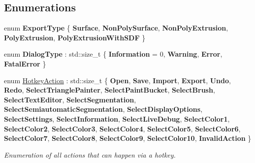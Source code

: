 \subsection*{Enumerations}
\begin{DoxyCompactItemize}
\item 
\mbox{\label{namespacepepr3d_a18ee6a20105f475c0c1e8622f98fc161}} 
enum {\bfseries Export\+Type} \{ \newline
{\bfseries Surface}, 
{\bfseries Non\+Poly\+Surface}, 
{\bfseries Non\+Poly\+Extrusion}, 
{\bfseries Poly\+Extrusion}, 
\newline
{\bfseries Poly\+Extrusion\+With\+S\+DF}
 \}
\item 
\mbox{\label{namespacepepr3d_ab78be750c70b46ae3d2dd03e440d4acc}} 
enum {\bfseries Dialog\+Type} \+: std\+::size\+\_\+t \{ {\bfseries Information} = 0, 
{\bfseries Warning}, 
{\bfseries Error}, 
{\bfseries Fatal\+Error}
 \}
\item 
\mbox{\label{namespacepepr3d_ae35d8dfd4e5925d633f100eb9b525cbe}} 
enum \mbox{\hyperlink{namespacepepr3d_ae35d8dfd4e5925d633f100eb9b525cbe}{Hotkey\+Action}} \+: std\+::size\+\_\+t \{ \newline
{\bfseries Open}, 
{\bfseries Save}, 
{\bfseries Import}, 
{\bfseries Export}, 
\newline
{\bfseries Undo}, 
{\bfseries Redo}, 
{\bfseries Select\+Triangle\+Painter}, 
{\bfseries Select\+Paint\+Bucket}, 
\newline
{\bfseries Select\+Brush}, 
{\bfseries Select\+Text\+Editor}, 
{\bfseries Select\+Segmentation}, 
{\bfseries Select\+Semiautomatic\+Segmentation}, 
\newline
{\bfseries Select\+Display\+Options}, 
{\bfseries Select\+Settings}, 
{\bfseries Select\+Information}, 
{\bfseries Select\+Live\+Debug}, 
\newline
{\bfseries Select\+Color1}, 
{\bfseries Select\+Color2}, 
{\bfseries Select\+Color3}, 
{\bfseries Select\+Color4}, 
\newline
{\bfseries Select\+Color5}, 
{\bfseries Select\+Color6}, 
{\bfseries Select\+Color7}, 
{\bfseries Select\+Color8}, 
\newline
{\bfseries Select\+Color9}, 
{\bfseries Select\+Color10}, 
{\bfseries Invalid\+Action}
 \}
\begin{DoxyCompactList}\small\item\em Enumeration of all actions that can happen via a hotkey. \end{DoxyCompactList}\end{DoxyCompactItemize}
